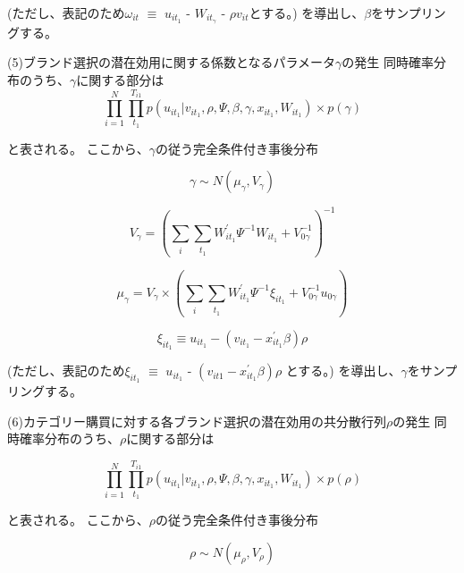 \documentclass[11pt]{jsarticle}
\begin{document}
(ただし、表記のため$\omega_{it}$ $\equiv$ $u_{it_{1}}$ - $W_{it_{\gamma}}$ - $\rho v_{it}$とする。)
を導出し、$\beta$をサンプリングする。

(5)ブランド選択の潜在効用に関する係数となるパラメータ$\gamma$の発生
同時確率分布のうち、$\gamma$に関する部分は
\begin{equation} \label{formula45}
\prod_{i=1}^{N} \prod_{t_{1}}^{T_{i1}} p(u_{it_{1}} | v_{it_{1}}, \rho, \Psi, \beta, \gamma, x_{it_{1}}, W_{it_{1}}) \times p(\gamma)
\end{equation}

と表される。
ここから、$\gamma$の従う完全条件付き事後分布

\begin{equation} \label{formula46}
\gamma \sim N(\mu_{\gamma}, V_{\gamma})
\end{equation}

\begin{equation} \label{formula47}
V_{\gamma} = 
\left(
\sum_{\substack{i}} \sum_{\substack{t_{1}}} W^{\prime}_{it_{1}} \Psi^{-1} W_{it_{1}} + V^{-1}_{0\gamma}
\right)^{-1}
\end{equation}

\begin{equation} \label{formula48}
\mu_{\gamma} = V_{\gamma} \times
\left(
\sum_{\substack{i}} \sum_{\substack{t_{1}}} W^{\prime}_{it_{1}} \Psi^{-1} \xi_{it_{1}} + V^{-1}_{0\gamma} u_{0\gamma}
\right)
\end{equation}

\begin{equation} \label{formula48-1}
\xi_{it_{1}} \equiv u_{it_{1}} - (v_{it_{1}} - x^{\prime}_{it_{1}} \beta) \rho
\end{equation}

(ただし、表記のため$\xi_{it_{1}}$ $\equiv$ $u_{it_{1}}$ - $(v_{it{1}} - x^{\prime}_{it_{1}}\beta)\rho$ とする。)
を導出し、$\gamma$をサンプリングする。

(6)カテゴリー購買に対する各ブランド選択の潜在効用の共分散行列$\rho$の発生
同時確率分布のうち、$\rho$に関する部分は

\begin{equation} \label{formula49}
\prod_{i=1}^{N} \prod_{t_{1}}^{T_{i1}} p(u_{it_{1}} | v_{it_{1}}, \rho, \Psi, \beta, \gamma, x_{it_{1}}, W_{it_{1}}) \times p(\rho)
\end{equation}

と表される。
ここから、$\rho$の従う完全条件付き事後分布

\begin{equation} \label{formula50}
\rho \sim N(\mu_{\rho}, V_{\rho})
\end{equation}
\end{document}
